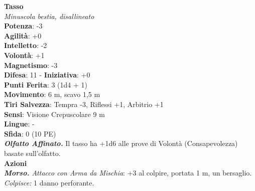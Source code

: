 \begin{multicols}{2}
\medskip\textbf{Tasso}\\
\emph{Minuscola bestia, disallineato}\\
\textbf{Potenza}: -3\\
\textbf{Agilità}: +0\\
\textbf{Intelletto}: -2\\
\textbf{Volontà}: +1\\
\textbf{Magnetismo}: -3\\
\textbf{Difesa}: 11 - \textbf{Iniziativa}: +0\\
\textbf{Punti Ferita}: 3 (1d4 + 1)\\
\textbf{Movimento}: 6 m, scavo 1,5 m\\
\textbf{Tiri Salvezza}: Tempra -3, Riflessi +1, Arbitrio +1\\
\textbf{Sensi}: Visione Crepuscolare 9 m\\
\textbf{Lingue}: -\\
\textbf{Sfida}: 0 (10 PE)\smallskip\\
\emph{\textbf{Olfatto Affinato.}} Il tasso ha +1d6 alle prove di Volontà (Consapevolezza) basate sull'olfatto.\\
\smallskip\textbf{Azioni}\\
\emph{\textbf{Morso.} Attacco con Arma da Mischia}: +3 al colpire, portata 1 m, un bersaglio.\\
\emph{Colpisce:} 1 danno perforante.\\


\end{multicols}
